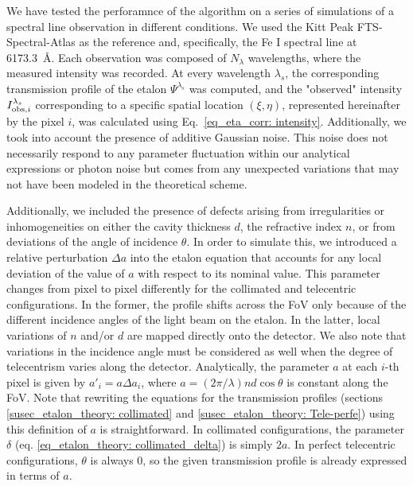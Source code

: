 We have tested the perforamnce of the algorithm on a series of simulations of a spectral line observation in different conditions. We used the Kitt Peak FTS-Spectral-Atlas as the reference \citep{fts} and, specifically, the Fe I spectral line at 6173.3~\r{A}. Each observation was composed of $N_\lambda$ wavelengths, where the measured intensity was recorded. At every wavelength $\lambda_s$, the corresponding transmission profile of the etalon $\Psi^{\lambda_s}$ was computed, and the "observed" intensity $I ^{\lambda _ s} _ {{\rm obs}, i}$ corresponding to a specific spatial location $(\xi, \eta)$, represented hereinafter by the pixel $i$, was calculated using Eq.~\eqref{eq_eta_corr: intensity}. Additionally, we took into account the presence of additive Gaussian noise. This noise does not necessarily respond to any parameter fluctuation within our analytical expressions or photon noise but comes from any unexpected variations that may not have been modeled in the theoretical scheme.

Additionally, we included the presence of defects arising from irregularities or inhomogeneities on either the cavity thickness $d$, the refractive index $n$, or from deviations of the angle of incidence $\theta$. In order to simulate this, we introduced a relative perturbation $\Delta a$ into the etalon equation that accounts for any local deviation of the value of $a$ with respect to its nominal value. This parameter changes from pixel to pixel differently for the collimated and telecentric configurations. In the former, the profile shifts across the FoV only because of the different incidence angles of the light beam on the etalon. In the latter, local variations of $n$ and/or $d$ are mapped directly onto the detector. We also note that variations in the incidence angle must be considered as well when the degree of telecentrism varies along the detector. Analytically, the parameter $a$ at each $i$-th pixel is given by $a' _ i = a \Delta a _ i$, where $a = (2\pi/\lambda) n d\cos\theta$ is constant along the FoV. Note that rewriting the equations for the transmission profiles (sections \ref{susec_etalon_theory: collimated} and \ref{susec_etalon_theory: Tele-perfe}) using this definition of $a$ is straightforward. In collimated configurations, the parameter $\delta$ (eq. \eqref{eq_etalon_theory: collimated_delta}) is simply $2a$. In perfect telecentric configurations, $\theta$ is always 0, so the given transmission profile is already expressed in terms of $a$.   

